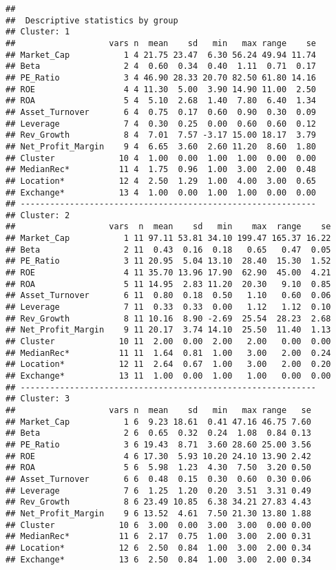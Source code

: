 \documentclass[
]{article}
\begin{document}
\begin{verbatim}
## 
##  Descriptive statistics by group 
## Cluster: 1
##                   vars n  mean    sd   min   max range    se
## Market_Cap           1 4 21.75 23.47  6.30 56.24 49.94 11.74
## Beta                 2 4  0.60  0.34  0.40  1.11  0.71  0.17
## PE_Ratio             3 4 46.90 28.33 20.70 82.50 61.80 14.16
## ROE                  4 4 11.30  5.00  3.90 14.90 11.00  2.50
## ROA                  5 4  5.10  2.68  1.40  7.80  6.40  1.34
## Asset_Turnover       6 4  0.75  0.17  0.60  0.90  0.30  0.09
## Leverage             7 4  0.30  0.25  0.00  0.60  0.60  0.12
## Rev_Growth           8 4  7.01  7.57 -3.17 15.00 18.17  3.79
## Net_Profit_Margin    9 4  6.65  3.60  2.60 11.20  8.60  1.80
## Cluster             10 4  1.00  0.00  1.00  1.00  0.00  0.00
## MedianRec*          11 4  1.75  0.96  1.00  3.00  2.00  0.48
## Location*           12 4  2.50  1.29  1.00  4.00  3.00  0.65
## Exchange*           13 4  1.00  0.00  1.00  1.00  0.00  0.00
## ------------------------------------------------------------ 
## Cluster: 2
##                   vars  n  mean    sd   min    max  range    se
## Market_Cap           1 11 97.11 53.81 34.10 199.47 165.37 16.22
## Beta                 2 11  0.43  0.16  0.18   0.65   0.47  0.05
## PE_Ratio             3 11 20.95  5.04 13.10  28.40  15.30  1.52
## ROE                  4 11 35.70 13.96 17.90  62.90  45.00  4.21
## ROA                  5 11 14.95  2.83 11.20  20.30   9.10  0.85
## Asset_Turnover       6 11  0.80  0.18  0.50   1.10   0.60  0.06
## Leverage             7 11  0.33  0.33  0.00   1.12   1.12  0.10
## Rev_Growth           8 11 10.16  8.90 -2.69  25.54  28.23  2.68
## Net_Profit_Margin    9 11 20.17  3.74 14.10  25.50  11.40  1.13
## Cluster             10 11  2.00  0.00  2.00   2.00   0.00  0.00
## MedianRec*          11 11  1.64  0.81  1.00   3.00   2.00  0.24
## Location*           12 11  2.64  0.67  1.00   3.00   2.00  0.20
## Exchange*           13 11  1.00  0.00  1.00   1.00   0.00  0.00
## ------------------------------------------------------------ 
## Cluster: 3
##                   vars n  mean    sd   min   max range   se
## Market_Cap           1 6  9.23 18.61  0.41 47.16 46.75 7.60
## Beta                 2 6  0.65  0.32  0.24  1.08  0.84 0.13
## PE_Ratio             3 6 19.43  8.71  3.60 28.60 25.00 3.56
## ROE                  4 6 17.30  5.93 10.20 24.10 13.90 2.42
## ROA                  5 6  5.98  1.23  4.30  7.50  3.20 0.50
## Asset_Turnover       6 6  0.48  0.15  0.30  0.60  0.30 0.06
## Leverage             7 6  1.25  1.20  0.20  3.51  3.31 0.49
## Rev_Growth           8 6 23.49 10.85  6.38 34.21 27.83 4.43
## Net_Profit_Margin    9 6 13.52  4.61  7.50 21.30 13.80 1.88
## Cluster             10 6  3.00  0.00  3.00  3.00  0.00 0.00
## MedianRec*          11 6  2.17  0.75  1.00  3.00  2.00 0.31
## Location*           12 6  2.50  0.84  1.00  3.00  2.00 0.34
## Exchange*           13 6  2.50  0.84  1.00  3.00  2.00 0.34
\end{verbatim}
\end{document}
